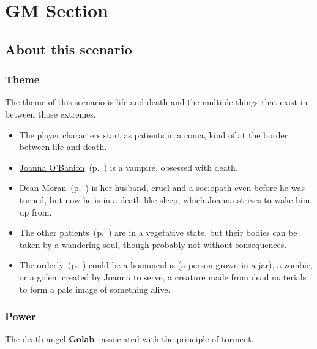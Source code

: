 \section{GM Section}%
\label{sec:gm_section}

\subsection{About this scenario}%
\label{sub:about_this_scenario}

\subsubsection{Theme}%
\label{ssub:theme}

The theme of this scenario is life and death and the multiple things that exist in between those
extremes.
\begin{itemize}[noitemsep]
  \item The player characters start as patients in a coma, kind of at the border between life and death.

  \item \hyperref[ssub:joanna_o_banion]{Joanna O'Banion}~(p.~\pageref{ssub:joanna_o_banion}) is a vampire, obsessed with death.

  \item Dean Moran~(p.~\pageref{ssub:joanna_o_banion}) is her husband, cruel and a sociopath even before he was turned, but now
        he is in a death like sleep, which Joanna strives to wake him up from.

  \item The other patients~(p.~\pageref{ssub:other_patients}) are in a vegetative state, but their bodies can be taken by
    a wandering soul, though probably not without consequences.

  \item The orderly~(p.~\pageref{ssub:orderly}) could be a homunculus (a person grown in a jar), a zombie, or a golem created
        by Joanna to serve, a creature made from dead materials to form a pale image of something alive.
\end{itemize}

\subsubsection{Power}%
\label{ssub:power}

The death angel \textbf{Golab}~\cite[p.~215]{KULT:core} associated with the principle of torment.

